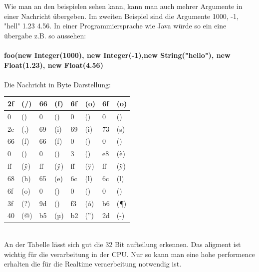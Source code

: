 \documentclass[a4paper, 12pt]{article}
\begin{document}
Wie man an den beispielen sehen kann, kann man auch mehrer Argumente in einer Nachricht übergeben. Im zweiten Beispiel sind die Argumente 1000, -1, "hell" 1.23 4.56.
In einer Programmiersprache wie Java würde so ein eine übergabe z.B. so aussehen:\\
\\
{\bf foo(new Integer(1000), new Integer(-1),new String("hello"), new Float(1.23), new Float(4.56)}\\
\\
Die Nachricht in Byte Darstellung:
\begin{table}[ht]
\centering
\begin{tabular}{|p{0.5cm}|p{1.5cm}|p{0.5cm}|p{1.5cm}|p{0.5cm}|p{1.5cm}|p{0.5cm}|p{1.5cm}|}
\hline
 2f & (/) & 66 & (f) & 6f & (o) & 6f & (o)\\ \hline
 0 & () & 0 & () & 0 & () & 0 & ()\\ \hline
 2c & (,) & 69 & (i) & 69 & (i) & 73 & (s) \\ \hline
 66 & (f) & 66 & (f) & 0 & () & 0 & () \\ \hline
 0 & () & 0 & () & 3 & () & e8 & (è) \\ \hline
 ff & (ÿ) & ff & (ÿ) & ff & (ÿ) & ff & (ÿ) \\
 68 & (h) & 65 & (e) & 6c & (l) & 6c & (l) \\ \hline
 6f & (o) & 0 & () & 0 & () & 0 & () \\ \hline
 3f & (?) & 9d & () & f3 & (ó) & b6 & (¶) \\ \hline
 40 & (@) & b5 & (µ) & b2 & (”) & 2d & (-) \\ \hline
\end{tabular}
\end{table}
\\
An der Tabelle lässt sich gut die 32 Bit aufteilung erkennen.
Das aligment ist wichtig für die verarbeitung in der CPU. Nur so kann man eine hohe performence erhalten die für die Realtime veraerbeitung notwendig ist.


\renewcommand{\refname}{REFERENCES}



\listoffigures
\end{document}
